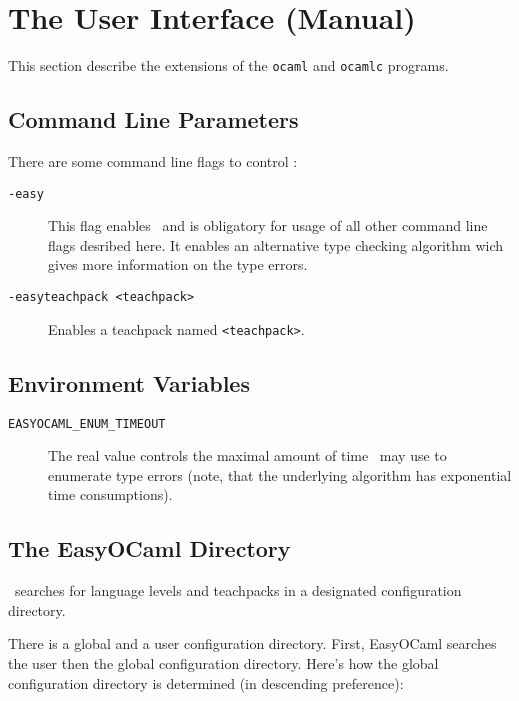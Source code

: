 
\section{The User Interface (Manual)}
\label{sec:manual}

This section describe the extensions of the \texttt{ocaml} and \texttt{ocamlc} programs.

\subsection{Command Line Parameters}
\label{sec:commandlineflags}

There are some command line flags to control \easyocaml:

\begin{description}
  \item[\texttt{-easy}] This flag enables \easyocaml\ and is obligatory for
    usage of all other command line flags desribed here.
    It enables an alternative type checking algorithm wich gives more
    information on the type errors.
  \item[\texttt{-easyteachpack <teachpack>}] Enables a teachpack named \texttt{<teachpack>}.
\end{description}

\subsection{Environment Variables}

\begin{description}
  \item[\texttt{EASYOCAML\_ENUM\_TIMEOUT}] \label{man:timeout}
    The real value controls the maximal amount of
    time \easyocaml\ may use to enumerate type errors (note, that the underlying algorithm
    has exponential time consumptions).
\end{description}


\subsection{The EasyOCaml Directory}

\easyocaml\ searches for language levels and teachpacks in a designated
configuration directory.

There is a global and a user configuration directory. First, EasyOCaml 
searches the user then the global configuration directory.  Here's how 
the global configuration directory is determined (in descending 
preference):

